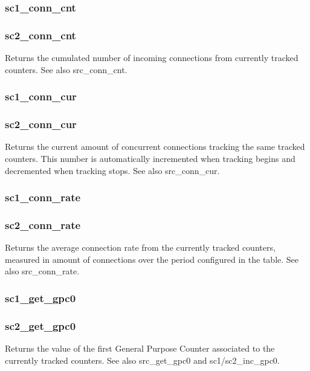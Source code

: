 \subsubsection[sc1\_conn\_cnt]{sc1\_conn\_cnt}
\subsubsection[sc2\_conn\_cnt]{sc2\_conn\_cnt}
  Returns the cumulated number of incoming connections from currently tracked
  counters. See also src\_conn\_cnt.

\subsubsection[sc1\_conn\_cur]{sc1\_conn\_cur}
\subsubsection[sc2\_conn\_cur]{sc2\_conn\_cur}
  Returns the current amount of concurrent connections tracking the same
  tracked counters. This number is automatically incremented when tracking
  begins and decremented when tracking stops. See also src\_conn\_cur.

\subsubsection[sc1\_conn\_rate]{sc1\_conn\_rate}
\subsubsection[sc2\_conn\_rate]{sc2\_conn\_rate}
  Returns the average connection rate from the currently tracked counters,
  measured in amount of connections over the period configured in the table.
  See also src\_conn\_rate.

\subsubsection[sc1\_get\_gpc0]{sc1\_get\_gpc0}
\subsubsection[sc2\_get\_gpc0]{sc2\_get\_gpc0}
  Returns the value of the first General Purpose Counter associated to the
  currently tracked counters. See also src\_get\_gpc0 and sc1/sc2\_inc\_gpc0.

